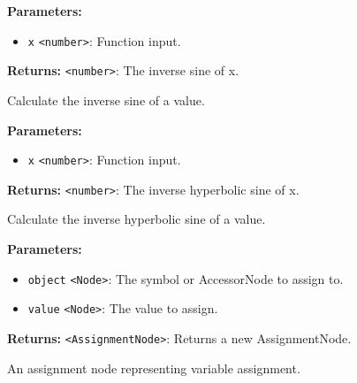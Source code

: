 \documentclass[12pt,a4paper]{article}
\begin{document}
\vspace{5mm}
\noindent {}


\noindent \textbf{Parameters:}
\begin{itemize}
  \item \texttt{x} \texttt{<number>}: Function input.
\end{itemize}

\noindent \textbf{Returns:} \texttt{<number>}: The inverse sine of \textasciigrave{}x\textasciigrave{}.

\noindent Calculate the inverse sine of a value.

\vspace{5mm}
\noindent {}


\noindent \textbf{Parameters:}
\begin{itemize}
  \item \texttt{x} \texttt{<number>}: Function input.
\end{itemize}

\noindent \textbf{Returns:} \texttt{<number>}: The inverse hyperbolic sine of \textasciigrave{}x\textasciigrave{}.

\noindent Calculate the inverse hyperbolic sine of a value.

\vspace{5mm}
\noindent {}


\noindent \textbf{Parameters:}
\begin{itemize}
  \item \texttt{object} \texttt{<Node>}: The symbol or AccessorNode to assign to.
  \item \texttt{value} \texttt{<Node>}: The value to assign.
\end{itemize}

\noindent \textbf{Returns:} \texttt{<AssignmentNode>}: Returns a new AssignmentNode.

\noindent An assignment node representing variable assignment.

\vspace{5mm}
\noindent {}
\end{document}
